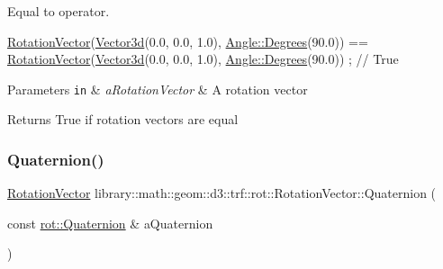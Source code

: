 Equal to operator. 


\begin{DoxyCode}
\hyperlink{classlibrary_1_1math_1_1geom_1_1d3_1_1trf_1_1rot_1_1_rotation_vector_a49076a279f457fdb14c4a9d4d61e1738}{RotationVector}(\hyperlink{namespacelibrary_1_1math_1_1obj_a977e84e9bf317a4e7dd9d6d671d6da2f}{Vector3d}(0.0, 0.0, 1.0), \hyperlink{classlibrary_1_1math_1_1geom_1_1_angle_a64aa53e8420aeb6f671d86c65c370bc8}{Angle::Degrees}(90.0)) == 
      \hyperlink{classlibrary_1_1math_1_1geom_1_1d3_1_1trf_1_1rot_1_1_rotation_vector_a49076a279f457fdb14c4a9d4d61e1738}{RotationVector}(\hyperlink{namespacelibrary_1_1math_1_1obj_a977e84e9bf317a4e7dd9d6d671d6da2f}{Vector3d}(0.0, 0.0, 1.0), \hyperlink{classlibrary_1_1math_1_1geom_1_1_angle_a64aa53e8420aeb6f671d86c65c370bc8}{Angle::Degrees}(90.0)) ; \textcolor{comment}{// True}
\end{DoxyCode}



\begin{DoxyParams}[1]{Parameters}
\mbox{\tt in}  & {\em a\+Rotation\+Vector} & A rotation vector \\
\hline
\end{DoxyParams}
\begin{DoxyReturn}{Returns}
True if rotation vectors are equal 
\end{DoxyReturn}
\mbox{\label{classlibrary_1_1math_1_1geom_1_1d3_1_1trf_1_1rot_1_1_rotation_vector_a6da4ed18679e28816896de413e04ed79}} 
\subsubsection{\texorpdfstring{Quaternion()}{Quaternion()}}
{\footnotesize\ttfamily \hyperlink{classlibrary_1_1math_1_1geom_1_1d3_1_1trf_1_1rot_1_1_rotation_vector}{Rotation\+Vector} library\+::math\+::geom\+::d3\+::trf\+::rot\+::\+Rotation\+Vector\+::\+Quaternion (\begin{DoxyParamCaption}\item[{const \hyperlink{classlibrary_1_1math_1_1geom_1_1d3_1_1trf_1_1rot_1_1_quaternion}{rot\+::\+Quaternion} \&}]{a\+Quaternion }\end{DoxyParamCaption})\hspace{0.3cm}{\ttfamily [static]}}



